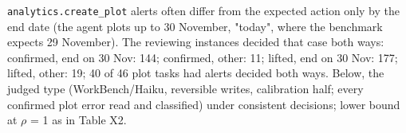 \begin{table}[htbp]
\centering\scriptsize
\caption*{Table X8. WorkBench plots: inconsistent alert review and sensitivity of the judged type (Exploratory, dated 18 November 2026; \texttt{exploratoire\_2/M\_plots\_review.csv}, \texttt{M\_plots\_sensitivity.csv})}
\label{tab:exp_table_x8}
\par\smallskip\parbox{\linewidth}{\tiny \texttt{analytics.create\_plot} alerts often differ from the expected action only by the end date (the agent plots up to 30 November, "today", where the benchmark expects 29 November). The reviewing instances decided that case both ways: confirmed, end on 30 Nov: 144; confirmed, other: 11; lifted, end on 30 Nov: 177; lifted, other: 19; 40 of 46 plot tasks had alerts decided both ways. Below, the judged type (WorkBench/Haiku, reversible writes, calibration half; every confirmed plot error read and classified) under consistent decisions; lower bound at $\rho$ = 1 as in Table X2.}
\end{table}
